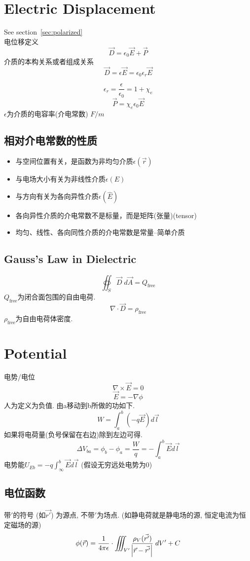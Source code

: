\documentclass[a4paper]{report}
\begin{document}
\section{Electric Displacement}
See section~\ref{sec:polarized}\\
电位移定义
$$\vec{D}=\epsilon _0 \vec{E}+\vec{P}$$
介质的本构关系或者组成关系
$$\vec{D}=\epsilon\vec{E}=\epsilon _0 \epsilon _r \vec{E}$$


$$\epsilon _r = \frac{\epsilon}{\epsilon _0}=1+\chi _e$$
$$ \vec{P}=\chi _e \epsilon _0 \vec{E}$$
$\epsilon$为介质的电容率(介电常数) $F/m$
\subsection{相对介电常数的性质}
\begin{itemize}
    \item 与空间位置有关，是函数为非均匀介质$\epsilon(\vec{r})$
    \item 与电场大小有关为非线性介质$\epsilon(E)$
    \item 与方向有关为各向异性介质$\epsilon(\hat{E})$
    \item 各向异性介质的介电常数不是标量，而是矩阵(张量)(tensor)
    \item 均匀、线性、各向同性介质的介电常数是常量--简单介质
\end{itemize}

\subsection{Gauss's Law in Dielectric}
$$\oiint_S \vec{D}\;d\vec{A}=Q _{\text{free}}$$
$Q _{\text{free}}$为闭合面包围的自由电荷. 
$$\nabla\cdot\vec{D}=\rho _{\text{free}}$$
$\rho _{\text{free}}$为自由电荷体密度. 

\section{Potential}
电势/电位
$$ \nabla\times\vec{E}=0 $$
$$ \vec{E}=-\nabla\phi $$
人为定义为负值. 
由a移动到b所做的功如下. 
$$W=\int_a^b(-q\vec{E})d\vec{l}$$
如果将电荷量(负号保留在右边)除到左边可得. 
$$\Delta V_{ba}=\phi_b-\phi_a=\frac{W}{q}=-\int_a^b\vec{E}d\vec{l}$$
电势能$U_{Eb}=-q\int^b_\infty\vec{E}d\vec{l}$ (假设无穷远处电势为0)
\subsection{电位函数}
带$\prime$的符号 (如$\vec{r'}$) 为源点, 不带$\prime$为场点. 
(如静电荷就是静电场的源, 恒定电流为恒定磁场的源)
$$\phi(\vec{r})=\frac{1}{4\pi\epsilon}\cdot\iiint_{V ^\prime} \frac{\rho_V(\vec{r^\prime})}{\abs{\vec{r}-\vec{r^\prime}}}\; dV ^\prime+C$$
\end{document}
